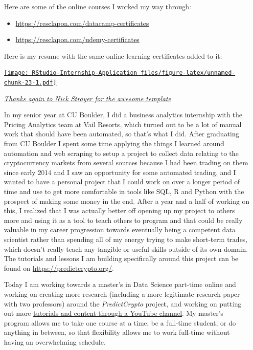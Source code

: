 \documentclass[
]{book}
\begin{document}
Here are some of the online courses I worked my way through:

\begin{itemize}
\item
  \url{https://resclapon.com/datacamp-certificates}
\item
  \url{https://resclapon.com/udemy-certificates}
\end{itemize}

Here is my resume with the same online learning certificates added to it:

\href{https://ricky-cv.netlify.com/}{\texttt{[image: RStudio-Internship-Application\_files/figure-latex/unnamed-chunk-23-1.pdf]}}

\emph{\href{https://github.com/nstrayer/cv}{Thanks again to Nick Strayer for the awesome template}}

In my senior year at CU Boulder, I did a business analytics internship with the Pricing Analytics team at Vail Resorts, which turned out to be a lot of manual work that should have been automated, so that's what I did. After graduating from CU Boulder I spent some time applying the things I learned around automation and web scraping to setup a project to collect data relating to the cryptocurrency markets from several sources because I had been trading on them since early 2014 and I saw an opportunity for some automated trading, and I wanted to have a personal project that I could work on over a longer period of time and use to get more comfortable in tools like SQL, R and Python with the prospect of making some money in the end. After a year and a half of working on this, I realized that I was actually better off opening up my project to others more and using it as a tool to teach others to program and that could be really valuable in my career progression towards eventually being a competent data scientist rather than spending all of my energy trying to make short-term trades, which doesn't really teach any tangible or useful skills outside of its own domain. The tutorials and lessons I am building specifically around this project can be found on \url{https://predictcrypto.org/}.

Today I am working towards a master's in Data Science part-time online and working on creating more research (including a more legitimate research paper with two professors) around the \emph{PredictCrypto} project, and working on putting out more \href{https://www.youtube.com/channel/UCZKbm8LERZBe_hwJNwroCPg?view_as=subscriber}{tutorials and content through a YouTube channel}. My master's program allows me to take one course at a time, be a full-time student, or do anything in between, so that flexibility allows me to work full-time without having an overwhelming schedule.
\end{document}
